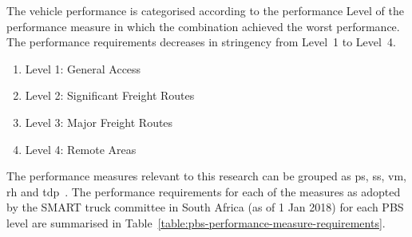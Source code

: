 The vehicle performance is categorised according to the performance Level of the performance measure in which the combination achieved the worst performance. The performance requirements decreases in stringency from Level~1 to Level~4.

\begin{enumerate}
  \item Level 1: General Access
  \item Level 2: Significant Freight Routes
  \item Level 3: Major Freight Routes
  \item Level 4: Remote Areas
\end{enumerate}

The performance measures relevant to this research can be grouped as \gls{ps}, \gls{ss}, \gls{vm}, \gls{rh} and \gls{tdp}~\cite{Arredondo2012}. The performance requirements for each of the measures as adopted by the SMART truck committee in South Africa (as of 1 Jan 2018) for each PBS level are summarised in Table~\ref{table:pbs-performance-measure-requirements}.

